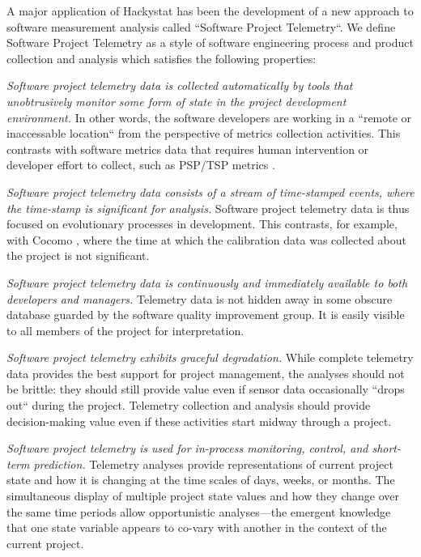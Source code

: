 A major application of Hackystat has been the development of a new
approach to software measurement analysis called ``Software Project
Telemetry``. We define Software Project Telemetry as a style of
software engineering process and product collection and analysis which
satisfies the following properties:

{\em Software project telemetry data is collected automatically by tools
that unobtrusively monitor some form of state in the project development
environment.}  In other words, the software developers are working in a
``remote or inaccessable location`` from the perspective of metrics
collection activities. This contrasts with software metrics data that
requires human intervention or developer effort to collect, such as PSP/TSP
metrics \cite{Humphrey95}.
        
{\em Software project telemetry data consists of a stream of time-stamped
events, where the time-stamp is significant for analysis.}  Software
project telemetry data is thus focused on evolutionary processes in
development.  This contrasts, for example, with Cocomo \cite{Boehm00},
where the time at which the calibration data was collected about the
project is not significant.

{\em Software project telemetry data is continuously and immediately
available to both developers and managers.}  Telemetry data is not hidden
away in some obscure database guarded by the software quality improvement
group.  It is easily visible to all members of the project for
interpretation.

{\em Software project telemetry exhibits graceful degradation.}  While
complete telemetry data provides the best support for project management,
the analyses should not be brittle: they should still provide value even if
sensor data occasionally ``drops out`` during the project. Telemetry
collection and analysis should provide decision-making value even if these
activities start midway through a project.
         
{\em Software project telemetry is used for in-process monitoring, control,
and short-term prediction.} Telemetry analyses provide representations of
current project state and how it is changing at the time scales of days,
weeks, or months.  The simultaneous display of multiple project state
values and how they change over the same time periods allow opportunistic
analyses---the emergent knowledge that one state variable appears to
co-vary with another in the context of the current project.


